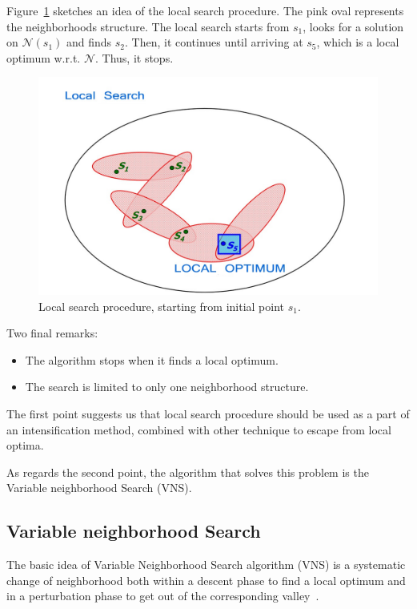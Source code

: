 Figure~\ref{fig:Local Search} sketches an idea of the local search procedure. The pink oval represents the neighborhoods structure. The local search starts from $s_1$, looks for a  solution on $\mathcal N(s_1)$ and finds $s_2$. Then, it continues until arriving at $s_5$, which is a local optimum w.r.t. $\mathcal N$. Thus, it stops.

 


\begin{figure}
	\centering
	\includegraphics[width=.65\textwidth]{Local_Search.png}
	\caption[Local search procedure]{Local search procedure, starting from initial point $s_1$.}
	\label{fig:Local Search}
\end{figure}

Two final remarks:
\begin{itemize}
	\item The algorithm stops when it finds a local optimum. 
	\item The search is limited to only one neighborhood structure. 
\end{itemize}

The first point suggests us that local search procedure should be used as a part of an intensification method, combined with other technique to escape from local optima.
 
As regards the second point, the algorithm that solves this problem is the Variable neighborhood Search (VNS).

\subsection{Variable neighborhood Search }


The basic idea  of Variable Neighborhood Search algorithm (VNS) is  a  systematic change of neighborhood both within a descent phase to find a local optimum and in a perturbation phase to get out of the corresponding valley~\cite[Ch. 3]{Gendreau2019}.



